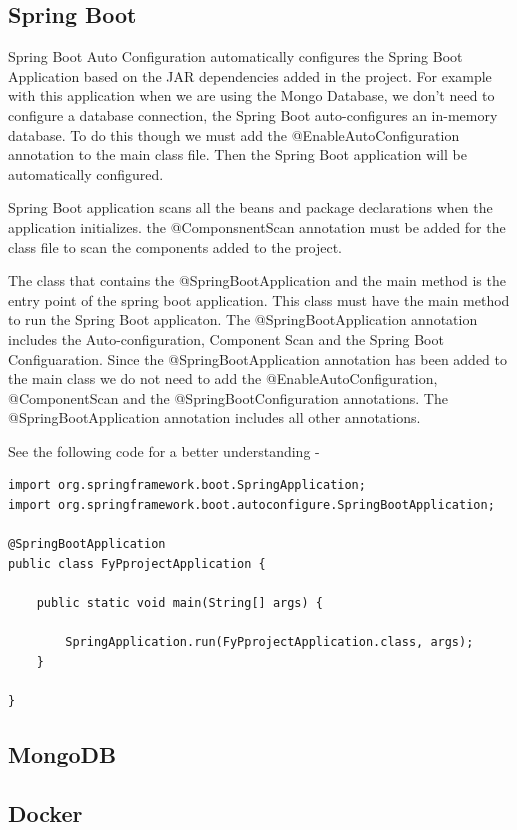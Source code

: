 \subsection{Spring Boot}
Spring Boot Auto Configuration automatically configures the Spring Boot Application based on the JAR dependencies added in the project. For example with this application when we are using the Mongo Database, we don't need to configure a database connection, the Spring Boot auto-configures an in-memory database. To do this though we must add the @EnableAutoConfiguration annotation to the main class file. Then the Spring Boot application will be automatically configured.\par
Spring Boot application scans all the beans and package declarations when the application initializes. the @ComponsnentScan annotation must be added for the class file to scan the components added to the project. \par
The class that contains the @SpringBootApplication and the main method is the entry point of the spring boot application. This class must have the main method to run the Spring Boot applicaton. The @SpringBootApplication annotation includes the Auto-configuration, Component Scan and the Spring Boot Configuaration. Since the @SpringBootApplication annotation has been added to the main class we do not need to add the @EnableAutoConfiguration, @ComponentScan and the @SpringBootConfiguration annotations. The @SpringBootApplication annotation includes all other annotations. \par
See the following code for a better understanding -
\begin{verbatim}
import org.springframework.boot.SpringApplication;
import org.springframework.boot.autoconfigure.SpringBootApplication;

@SpringBootApplication
public class FyPprojectApplication {

	public static void main(String[] args) {

		SpringApplication.run(FyPprojectApplication.class, args);
	}

}
\end{verbatim}

\subsection{MongoDB}

\subsection{Docker}

